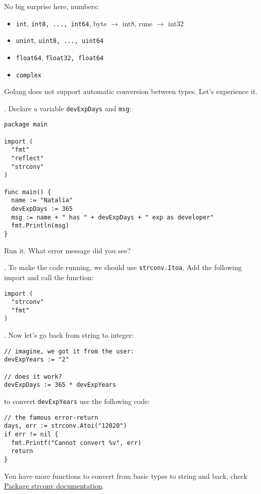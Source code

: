 \documentclass[11pt, letterpaper]{article}
\begin{document}
No big surprise here, numbers:

\begin{itemize}
\item \verb|int|, \verb|int8, ..., int64|, byte $\rightarrow$ int8, rune $\rightarrow$ int32
\item \verb|unint|, \verb|uint8, ..., uint64|
\item \verb|float64|, \verb|float32, float64|
\item \verb|complex|
\end{itemize}

Golang does not support automatic conversion between types. Let's experience it.

. Declare a variable \texttt{devExpDays} and \texttt{msg}:

\begin{verbatim}
package main

import (
  "fmt"
  "reflect"
  "strconv"
)

func main() {
  name := "Natalia"
  devExpDays := 365
  msg := name + " has " + devExpDays + " exp as developer"
  fmt.Println(msg)
}
\end{verbatim}

Run it. What error message did you see?

. To make the code running, we should use \texttt{strconv.Itoa}. Add the following import and call the function:

\begin{verbatim}
import (
  "strconv"
  "fmt"
)
\end{verbatim}

. Now let's go back from string to integer:

\begin{verbatim}
// imagine, we got it from the user:
devExpYears := "2"

// does it work?
devExpDays := 365 * devExpYears
\end{verbatim}

to convert \texttt{devExpYears} use the following code:

\begin{verbatim}
// the famous error-return
days, err := strconv.Atoi("12020")
if err != nil {
  fmt.Printf("Cannot convert %v", err)
  return
}
\end{verbatim}

You have more functions to convert from basic types to string and back, check \href{https://golang.org/pkg/strconv}{Package strconv documentation}.
\end{document}
